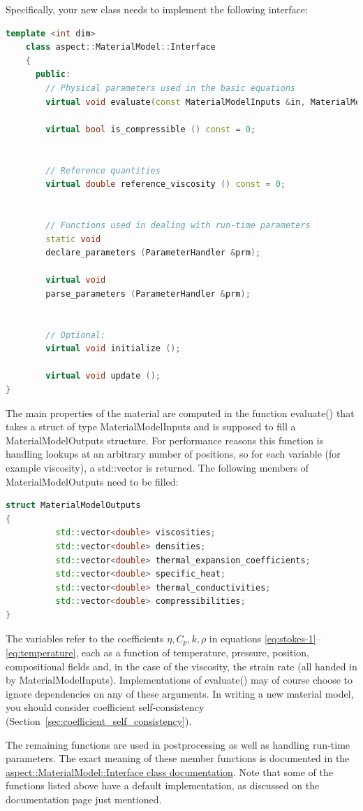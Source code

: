 \documentclass{article}
\begin{document}
Specifically, your new class needs to implement the following interface:
\begin{lstlisting}[frame=single,language=C++]
    template <int dim>
    class aspect::MaterialModel::Interface
    {
      public:
        // Physical parameters used in the basic equations
        virtual void evaluate(const MaterialModelInputs &in, MaterialModelOutputs &out) const=0;

        virtual bool is_compressible () const = 0;


        // Reference quantities
        virtual double reference_viscosity () const = 0;


        // Functions used in dealing with run-time parameters
        static void
        declare_parameters (ParameterHandler &prm);

        virtual void
        parse_parameters (ParameterHandler &prm);


        // Optional:
        virtual void initialize ();

        virtual void update ();
}
\end{lstlisting}
The main properties of the material are computed in the function
evaluate() that takes a struct of type MaterialModelInputs and is
supposed to fill a MaterialModelOutputs structure. For performance
reasons this function is handling lookups at an arbitrary number
of positions, so for each variable (for example viscosity), a
std::vector is returned. The following members of MaterialModelOutputs
need to be filled:
\begin{lstlisting}[frame=single,language=C++]
struct MaterialModelOutputs
{
          std::vector<double> viscosities;
          std::vector<double> densities;
          std::vector<double> thermal_expansion_coefficients;
          std::vector<double> specific_heat;
          std::vector<double> thermal_conductivities;
          std::vector<double> compressibilities;
}
\end{lstlisting}
The variables refer to the coefficients $\eta,C_p,k,\rho$ in
equations \eqref{eq:stokes-1}--\eqref{eq:temperature}, each as a function of temperature,
pressure, position, compositional fields and, in the case of the viscosity, the strain rate
(all handed in by MaterialModelInputs). Implementations of evaluate() may of course choose to
ignore dependencies on any of these arguments. In writing a new material model, you should
consider coefficient self-consistency (Section~\ref{sec:coefficient_self_consistency}).

The remaining functions are used in postprocessing as well as
handling run-time parameters. The exact meaning of these member functions is
documented in the
\href{doc/doxygen/classaspect_1_1MaterialModel_1_1Interface.html}{aspect::MaterialModel::Interface
class documentation}. Note that some of the functions listed above have a
default implementation, as discussed on the documentation page just
mentioned.
\end{document}
